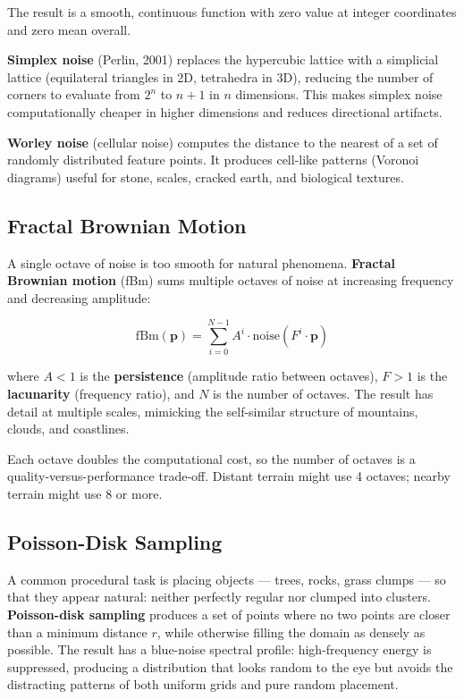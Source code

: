 \documentclass[
  11pt,
  letterpaper,
  DIV=11,
  numbers=noendperiod,
  twoside,
  open=right]{scrreprt}
\begin{document}
The result is a smooth, continuous function with zero value at integer
coordinates and zero mean overall.

\textbf{Simplex noise} (Perlin, 2001) replaces the hypercubic lattice
with a simplicial lattice (equilateral triangles in 2D, tetrahedra in
3D), reducing the number of corners to evaluate from \(2^n\) to
\(n + 1\) in \(n\) dimensions. This makes simplex noise computationally
cheaper in higher dimensions and reduces directional artifacts.

\textbf{Worley noise} (cellular noise) computes the distance to the
nearest of a set of randomly distributed feature points. It produces
cell-like patterns (Voronoi diagrams) useful for stone, scales, cracked
earth, and biological textures.

\subsection{Fractal Brownian Motion}\label{fractal-brownian-motion}

A single octave of noise is too smooth for natural phenomena.
\textbf{Fractal Brownian motion} (fBm) sums multiple octaves of noise at
increasing frequency and decreasing amplitude:

\[
\text{fBm}(\mathbf{p}) = \sum_{i=0}^{N-1} A^i \cdot \text{noise}(F^i \cdot \mathbf{p})
\]

where \(A < 1\) is the \textbf{persistence} (amplitude ratio between
octaves), \(F > 1\) is the \textbf{lacunarity} (frequency ratio), and
\(N\) is the number of octaves. The result has detail at multiple
scales, mimicking the self-similar structure of mountains, clouds, and
coastlines.

Each octave doubles the computational cost, so the number of octaves is
a quality-versus-performance trade-off. Distant terrain might use 4
octaves; nearby terrain might use 8 or more.

\subsection{Poisson-Disk Sampling}\label{poisson-disk-sampling}

A common procedural task is placing objects --- trees, rocks, grass
clumps --- so that they appear natural: neither perfectly regular nor
clumped into clusters. \textbf{Poisson-disk sampling} produces a set of
points where no two points are closer than a minimum distance \(r\),
while otherwise filling the domain as densely as possible. The result
has a blue-noise spectral profile: high-frequency energy is suppressed,
producing a distribution that looks random to the eye but avoids the
distracting patterns of both uniform grids and pure random placement.
\end{document}
